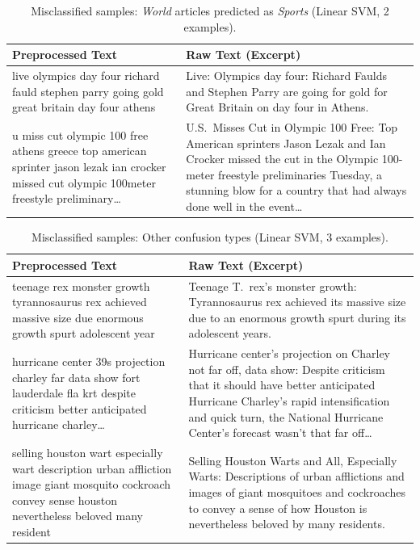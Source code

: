 \newpage

\begin{table}[htbp]
\centering
\caption{Misclassified samples: \textit{World} articles predicted as \textit{Sports} (Linear SVM, 2 examples).}
\label{tab:linsvm-world-sports}
\small
\begin{tabular}{p{0.6\textheight} p{0.6\textheight}}
\toprule
\textbf{Preprocessed Text} & \textbf{Raw Text (Excerpt)} \\
\midrule
live olympics day four richard fauld stephen parry going gold great britain day four athens &
Live: Olympics day four: Richard Faulds and Stephen Parry are going for gold for Great Britain on day four in Athens. \\
\addlinespace
u miss cut olympic 100 free athens greece top american sprinter jason lezak ian crocker missed cut olympic 100meter freestyle preliminary\ldots &
U.S.\ Misses Cut in Olympic 100 Free: Top American sprinters Jason Lezak and Ian Crocker missed the cut in the Olympic 100-meter freestyle preliminaries Tuesday, a stunning blow for a country that had always done well in the event\ldots \\
\bottomrule
\end{tabular}
\end{table}

\begin{table}[htbp]
\centering
\caption{Misclassified samples: Other confusion types (Linear SVM, 3 examples).}
\label{tab:linsvm-other}
\small
\begin{tabular}{p{0.6\textheight} p{0.6\textheight}}
\toprule
\textbf{Preprocessed Text} & \textbf{Raw Text (Excerpt)} \\
\midrule
teenage rex monster growth tyrannosaurus rex achieved massive size due enormous growth spurt adolescent year &
Teenage T.\ rex's monster growth: Tyrannosaurus rex achieved its massive size due to an enormous growth spurt during its adolescent years. \\
\addlinespace
hurricane center 39s projection charley far data show fort lauderdale fla krt despite criticism better anticipated hurricane charley\ldots &
Hurricane center's projection on Charley not far off, data show: Despite criticism that it should have better anticipated Hurricane Charley's rapid intensification and quick turn, the National Hurricane Center's forecast wasn't that far off\ldots \\
\addlinespace
selling houston wart especially wart description urban affliction image giant mosquito cockroach convey sense houston nevertheless beloved many resident &
Selling Houston Warts and All, Especially Warts: Descriptions of urban afflictions and images of giant mosquitoes and cockroaches to convey a sense of how Houston is nevertheless beloved by many residents. \\
\bottomrule
\end{tabular}
\end{table}

